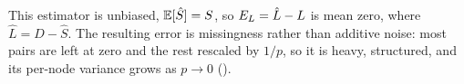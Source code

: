 This estimator is unbiased, $\mathbb{E}[\hat S]=S$, so $E_{L}=\hat L-L$ is mean zero, where
$\hat L=\hat D-\hat S$. The resulting error is missingness rather than additive noise:
most pairs are left at zero and the rest rescaled by $1/p$, so it is heavy, structured, and
its per-node variance grows as $p\to0$ ().



